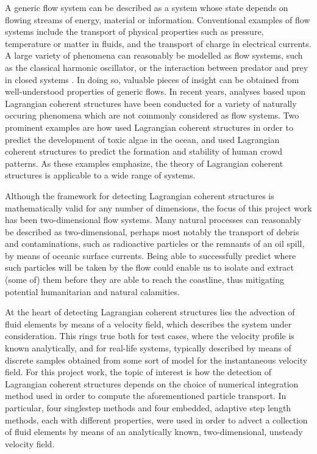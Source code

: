 A generic flow system can be described as a system whose state depends on
flowing streams of energy, material or information. Conventional examples of
flow systems include the transport of physical properties such as pressure,
temperature or matter in fluids, and the transport of charge in electrical
currents. A large variety of phenomena can reasonably be modelled as flow
systems, such as the classical harmonic oscillator, or the interaction between
predator and prey in closed systems
\parencite[parts I--II]{strogatz2014nonlinear}. In doing so, valuable pieces
of insight can be obtained from well-understood properties of generic flows.
In recent years, analyses based upon Lagrangian coherent structures have been
conducted for a variety of naturally occuring phenomena which are not
commonly considered as flow systems. Two prominent examples are how
\textcite{olascoaga2008tracing} used Lagrangian coherent structures in order
to predict the development of toxic algae in the ocean, and
\textcite{ali2007lagrangian} used Lagrangian coherent structures to predict
the formation and stability of human crowd patterns. As these examples
emphasize, the theory of Lagrangian coherent structures is applicable to a
wide range of systems.

Although the framework for detecting Lagrangian coherent structures is
mathematically valid for any number of dimensions, the focus of this project
work has been two-dimensional flow systems. Many natural processes can
reasonably be described as two-dimensional, perhaps most notably the transport
of debris and contaminations, such as radioactive particles or the remnants of
an oil spill, by means of oceanic surface currents. Being able to successfully
predict where such particles will be taken by the flow could enable us to
isolate and extract (some of) them before they are able to reach the coastline,
thus mitigating potential humanitarian and natural calamities.

%
At the heart of detecting Lagrangian coherent structures lies the advection
of fluid elements by means of a velocity field, which describes the system
under consideration. This rings true both for test cases, where the velocity
profile is known analytically, and for real-life systems, typically described
by means of discrete samples obtained from some sort of model for the
instantaneous velocity field. For this project work, the topic of interest is
how the detection of Lagrangian coherent structures depends on the choice of
numerical integration method used in order to compute the aforementioned
particle transport. In particular, four singlestep methods and four embedded,
adaptive step length methods, each with different properties, were used in
order to advect a collection of fluid elements by means of an analytically
known, two-dimensional, unsteady velocity field.

